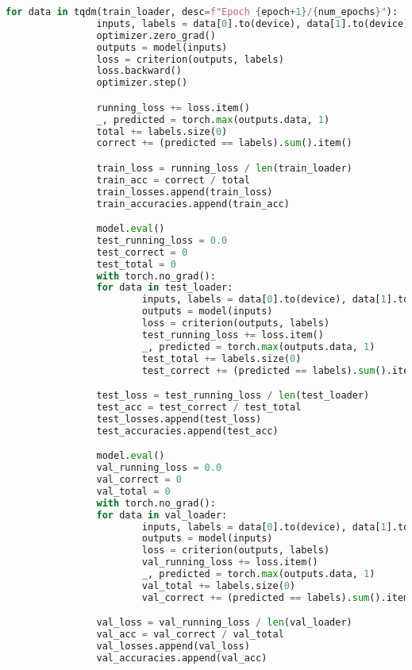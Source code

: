 \begin{lstlisting}[language=Python, caption={Python skript použitý na trenovanie modelu}, label={lst:emotion-recognition}]
        for data in tqdm(train_loader, desc=f"Epoch {epoch+1}/{num_epochs}"):
                inputs, labels = data[0].to(device), data[1].to(device)
                optimizer.zero_grad()
                outputs = model(inputs)
                loss = criterion(outputs, labels)
                loss.backward()
                optimizer.step()

                running_loss += loss.item()
                _, predicted = torch.max(outputs.data, 1)
                total += labels.size(0)
                correct += (predicted == labels).sum().item()

                train_loss = running_loss / len(train_loader)
                train_acc = correct / total
                train_losses.append(train_loss)
                train_accuracies.append(train_acc)

                model.eval()
                test_running_loss = 0.0
                test_correct = 0
                test_total = 0
                with torch.no_grad():
                for data in test_loader:
                        inputs, labels = data[0].to(device), data[1].to(device)
                        outputs = model(inputs)
                        loss = criterion(outputs, labels)
                        test_running_loss += loss.item()
                        _, predicted = torch.max(outputs.data, 1)
                        test_total += labels.size(0)
                        test_correct += (predicted == labels).sum().item()

                test_loss = test_running_loss / len(test_loader)
                test_acc = test_correct / test_total
                test_losses.append(test_loss)
                test_accuracies.append(test_acc)

                model.eval()
                val_running_loss = 0.0
                val_correct = 0
                val_total = 0
                with torch.no_grad():
                for data in val_loader:
                        inputs, labels = data[0].to(device), data[1].to(device)
                        outputs = model(inputs)
                        loss = criterion(outputs, labels)
                        val_running_loss += loss.item()
                        _, predicted = torch.max(outputs.data, 1)
                        val_total += labels.size(0)
                        val_correct += (predicted == labels).sum().item()

                val_loss = val_running_loss / len(val_loader)
                val_acc = val_correct / val_total
                val_losses.append(val_loss)
                val_accuracies.append(val_acc)


\end{lstlisting}
